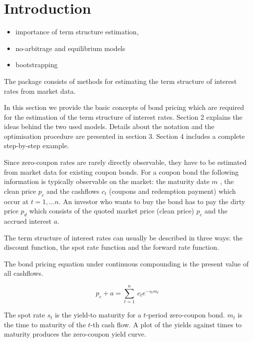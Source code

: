 \section{Introduction}

\begin{itemize}
\item importance of term structure estimation, \cite{BIS2005, Bolder1999, Bliss1997, Ioannides2003, Diebold2006, Nawalkha2005}
\item no-arbitrage and equilibrium models 
\item bootstrapping
\end{itemize}

\cite{BIS2005}


The  package  consists of methods for estimating the term structure of interest rates from market data.

In this section we provide the basic concepts of bond pricing which are required for the estimation of the term structure of interest rates. Section 2 explains the ideas behind the two used models. Details about the notation and the optimisation procedure are presented in section 3. Section 4 includes a complete step-by-step example.


Since zero-coupon rates are rarely directly observable, they have to be estimated from market data for existing coupon bonds. For a coupon bond the following information is typically observable on the market: the maturity date $m$ , the clean price $p_c$ and the cashflows $c_t$ (coupons and redemption payment) which occur at $t=1,...n$. An investor who wants to buy the bond has to pay the dirty price $p_d$ which consists of the quoted market price (clean price) $p_c$ and the accrued interest $a$.

The term structure of interest rates can usually be described in three ways: the discount function, the
spot rate function and the forward rate function.

The bond pricing equation under continuous compounding is the present value of all cashflows.

\begin{equation}
  \label{bondpriceeq}
  p_c+a = \sum_{t=1}^n \ c_t e^{-s_tm_t}
\end{equation}

The spot rate $s_t$ is the yield-to maturity for a $t$-period zero-coupon bond. $m_t$ is the time to maturity of the $t$-th cash flow. A plot of the yields against times to maturity produces the zero-coupon yield curve.

